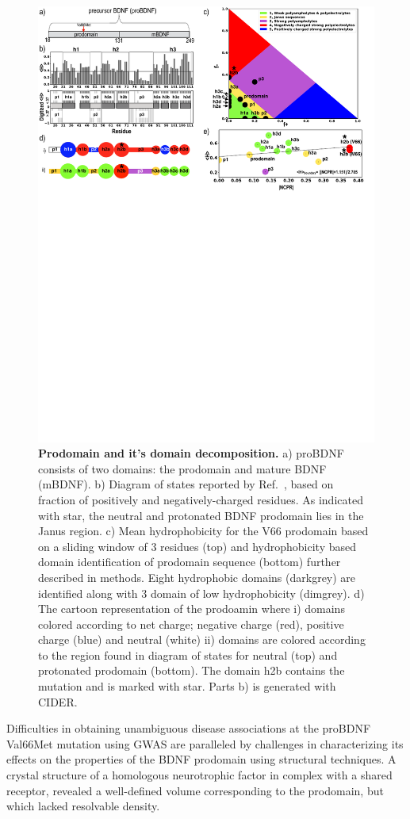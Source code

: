 \documentclass[journal=jacsat,manuscript=article]{achemso}
\begin{document}
\begin{figure}[!ht]
 \includegraphics[scale=0.5,width=\textwidth,trim={0 0cm 0 0cm},clip]{../figures/fig1.pdf}
\caption{{\bf Prodomain and it's domain decomposition.} 
a) proBDNF consists of two domains: the prodomain and mature BDNF (mBDNF). b) Diagram of states reported by Ref.~\cite {Das2015,Das2013a}, based on fraction of positively and negatively-charged residues.  As indicated with star, the neutral and protonated BDNF prodomain lies in the Janus region.
c) Mean hydrophobicity for the V66 prodomain based on a sliding window of 3 residues (top) and hydrophobicity based domain identification of prodomain sequence (bottom) further described in methods. Eight hydrophobic domains (darkgrey) are identified along with 3 domain of low hydrophobicity (dimgrey). d) The cartoon representation of the prodoamin where i) domains colored according to net charge; negative charge (red), positive charge (blue) and neutral (white) ii) domains are colored according to the region found in diagram of states for neutral (top) and protonated prodomain (bottom). The domain h2b contains the mutation and is marked with star. Parts b) is generated with CIDER. ~\cite {Holehouse2017}}
\label{fig1} 
\end{figure}
Difficulties in obtaining unambiguous disease associations at the proBDNF Val66Met mutation using GWAS are paralleled by challenges in characterizing its effects on the properties of the BDNF prodomain using structural techniques.  A crystal structure of a homologous neurotrophic factor in complex with a shared receptor, revealed a well-defined volume corresponding to the prodomain, but which lacked resolvable density.\cite{Feng2010a} 
\end{document}
